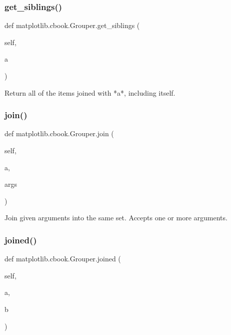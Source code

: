 \subsubsection{\texorpdfstring{get\+\_\+siblings()}{get\_siblings()}}
{\footnotesize\ttfamily def matplotlib.\+cbook.\+Grouper.\+get\+\_\+siblings (\begin{DoxyParamCaption}\item[{}]{self,  }\item[{}]{a }\end{DoxyParamCaption})}

\begin{DoxyVerb}Return all of the items joined with *a*, including itself.\end{DoxyVerb}
 \mbox{\label{classmatplotlib_1_1cbook_1_1Grouper_a4bf36936f9e0646e98fa5e53c0ee8a74}} 
\subsubsection{\texorpdfstring{join()}{join()}}
{\footnotesize\ttfamily def matplotlib.\+cbook.\+Grouper.\+join (\begin{DoxyParamCaption}\item[{}]{self,  }\item[{}]{a,  }\item[{}]{args }\end{DoxyParamCaption})}

\begin{DoxyVerb}Join given arguments into the same set.  Accepts one or more arguments.
\end{DoxyVerb}
 \mbox{\label{classmatplotlib_1_1cbook_1_1Grouper_ad16464cb2d394ad2bc6d107127367e50}} 
\subsubsection{\texorpdfstring{joined()}{joined()}}
{\footnotesize\ttfamily def matplotlib.\+cbook.\+Grouper.\+joined (\begin{DoxyParamCaption}\item[{}]{self,  }\item[{}]{a,  }\item[{}]{b }\end{DoxyParamCaption})}

